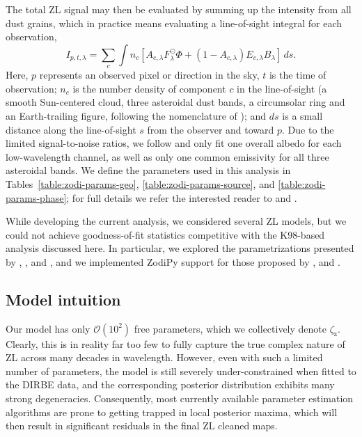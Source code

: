 \documentclass[twocolumn]{aa}
\begin{document}
The total ZL signal may then be evaluated by summing up the intensity
from all dust grains, which in practice means evaluating a line-of-sight 
integral for each observation,
\begin{equation}\label{eq:los}
    I_{p,t, \lambda} = \sum_c \int n_c \left[  A_{c, \lambda} F_\lambda^\odot \Phi + \left( 1 - A_{c, \lambda} \right) E_{c,\lambda} B_\lambda \right]\,ds.
\end{equation}
Here, $p$ represents an observed pixel or direction in the sky, $t$ is
the time of observation; $n_c$ is the number density of component $c$
in the line-of-sight (a smooth Sun-centered cloud, three asteroidal dust bands, a 
circumsolar ring and an Earth-trailing figure, following the nomenclature of \citealt{kelsall1998}); 
and $ds$ is a small distance along the
line-of-sight $s$ from the observer and toward $p$. Due to the limited signal-to-noise ratios, we follow
\citet{kelsall1998} and only fit one overall albedo for each
low-wavelength channel, as well as only one common emissivity for all
three asteroidal bands. We define the parameters used in this 
analysis in Tables~\ref{table:zodi-params-geo}, \ref{table:zodi-params-source}, and 
\ref{table:zodi-params-phase}; 
for full details we refer the interested reader to
\citet{kelsall1998} and \citet{Hong}.

While developing the current analysis, we considered several ZL 
models, but we could not achieve goodness-of-fit statistics 
competitive with the K98-based analysis discussed here.
In particular, we explored the parametrizations presented by \citet{wright:1998}, 
\citet{Robinson2013}, and \citet{Odegard2019}, and we implemented ZodiPy support for those 
proposed by \citet{Robinson2013}, and \citet{Odegard2019}.



\subsection{Model intuition}

Our model has only $\mathcal{O}(10^2)$ free
parameters, which we collectively denote
$\zeta_{\mathrm{z}}$. Clearly, this is in reality far too few to fully
capture the true complex nature of ZL across many decades in
wavelength. However, even with such a limited number of parameters,
the model is still severely under-constrained when fitted to the DIRBE
data, and the corresponding posterior distribution exhibits many
strong degeneracies. Consequently, most currently available parameter
estimation algorithms are prone to getting trapped in local posterior
maxima, which will then result in significant residuals in the
final ZL cleaned maps.
\end{document}
